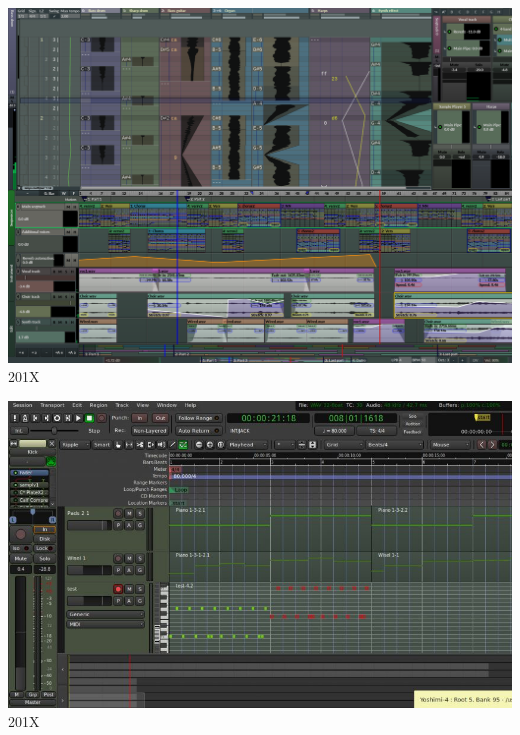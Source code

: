 \documentclass{beamer}
\begin{document}
\begin{frame}
  \begin{center}
    \includegraphics[scale=0.242]{images/radium_5_9_48-resized.png}\\
    201X
  \end{center}
\end{frame}

\begin{frame}
  \begin{center}
    \includegraphics[scale=1.62]{images/Screenshot-from-2017-08-01-17-44-03-1024x515-resized.jpg}\\
    201X
  \end{center}
\end{frame}
\end{document}
